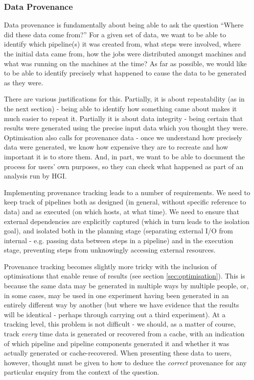 \documentclass[10pt,a4paper]{article}
\newcommand{\npar}{\par\noindent\space}
\begin{document}
\subsubsection{Data Provenance}
\label{sec:provenance}
\npar Data provenance is fundamentally about being able to ask the question ``Where did these data come from?'' For a given set of data, we want to be able to identify which pipeline(s) it was created from, what steps were involved, where the initial data came from, how the jobs were distributed amongst machines and what was running on the machines at the time? As far as possible, we would like to be able to identify precisely what happened to cause the data to be generated as they were.
\npar There are various justifications for this. Partially, it is about repeatability (as in the next section) - being able to identify how something came about makes it much easier to repeat it. Partially it is about data integrity - being certain that results were generated using the precise input data which you thought they were. Optimisation also calls for provenance data - once we understand how precisely data were generated, we know how expensive they are to recreate and how important it is to store them. And, in part, we want to be able to document the process for users' own purposes, so they can check what happened as part of an analysis run by HGI.
\npar Implementing provenance tracking leads to a number of requirements. We need to keep track of pipelines both as designed (in general, without specific reference to data) and as executed (on which hosts, at what time). We need to ensure that external dependencies are explicitly captured (which in turn leads to the isolation goal), and isolated both in the planning stage (separating external I/O from internal - e.g. passing data between steps in a pipeline) and in the execution stage, preventing steps from unknowingly accessing external resources.
\npar Provenance tracking becomes slightly more tricky with the inclusion of optimisations that enable reuse of results (see section \ref{sec:optimisation}). This is because the same data may be generated in multiple ways by multiple people, or, in some cases, may be used in one experiment having been generated in an entirely different way by another (but where we have evidence that the results will be identical - perhaps through carrying out a third experiment). At a tracking level, this problem is not difficult - we should, as a matter of course, track \textit{every} time data is generated or recovered from a cache, with an indication of which pipeline and pipeline components generated it and whether it was actually generated or cache-recovered. When presenting these data to users, however, thought must be given to how to deduce the \textit{correct} provenance for any particular enquiry from the context of the question.
\end{document}
